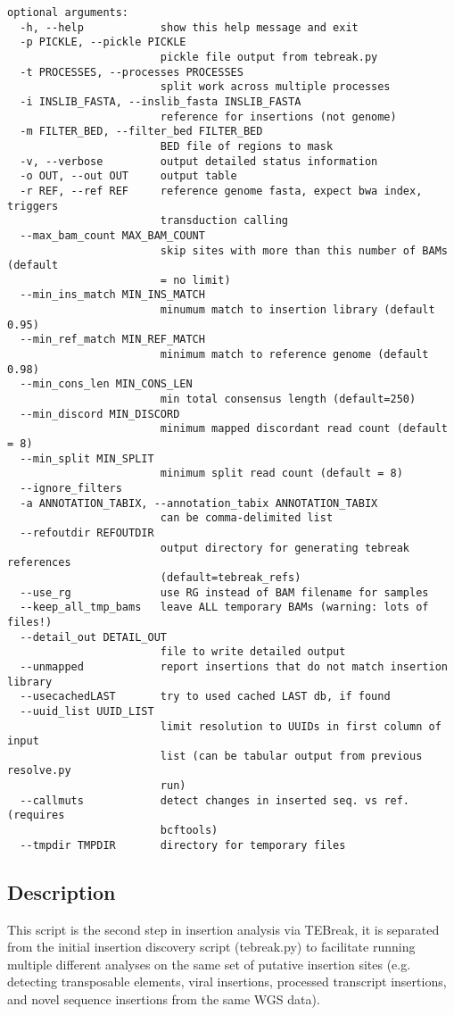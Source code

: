\documentclass[letterpaper,11pt]{article}
\begin{document}
\begin{verbatim}
optional arguments:
  -h, --help            show this help message and exit
  -p PICKLE, --pickle PICKLE
                        pickle file output from tebreak.py
  -t PROCESSES, --processes PROCESSES
                        split work across multiple processes
  -i INSLIB_FASTA, --inslib_fasta INSLIB_FASTA
                        reference for insertions (not genome)
  -m FILTER_BED, --filter_bed FILTER_BED
                        BED file of regions to mask
  -v, --verbose         output detailed status information
  -o OUT, --out OUT     output table
  -r REF, --ref REF     reference genome fasta, expect bwa index, triggers
                        transduction calling
  --max_bam_count MAX_BAM_COUNT
                        skip sites with more than this number of BAMs (default
                        = no limit)
  --min_ins_match MIN_INS_MATCH
                        minumum match to insertion library (default 0.95)
  --min_ref_match MIN_REF_MATCH
                        minimum match to reference genome (default 0.98)
  --min_cons_len MIN_CONS_LEN
                        min total consensus length (default=250)
  --min_discord MIN_DISCORD
                        minimum mapped discordant read count (default = 8)
  --min_split MIN_SPLIT
                        minimum split read count (default = 8)
  --ignore_filters
  -a ANNOTATION_TABIX, --annotation_tabix ANNOTATION_TABIX
                        can be comma-delimited list
  --refoutdir REFOUTDIR
                        output directory for generating tebreak references
                        (default=tebreak_refs)
  --use_rg              use RG instead of BAM filename for samples
  --keep_all_tmp_bams   leave ALL temporary BAMs (warning: lots of files!)
  --detail_out DETAIL_OUT
                        file to write detailed output
  --unmapped            report insertions that do not match insertion library
  --usecachedLAST       try to used cached LAST db, if found
  --uuid_list UUID_LIST
                        limit resolution to UUIDs in first column of input
                        list (can be tabular output from previous resolve.py
                        run)
  --callmuts            detect changes in inserted seq. vs ref. (requires
                        bcftools)
  --tmpdir TMPDIR       directory for temporary files

\end{verbatim}

\subsection{Description}
This script is the second step in insertion analysis via TEBreak, it is separated from the initial insertion discovery script (tebreak.py) to facilitate running multiple different analyses on the same set of putative insertion sites (e.g. detecting transposable elements, viral insertions, processed transcript insertions, and novel sequence insertions from the same WGS data).
\end{document}
